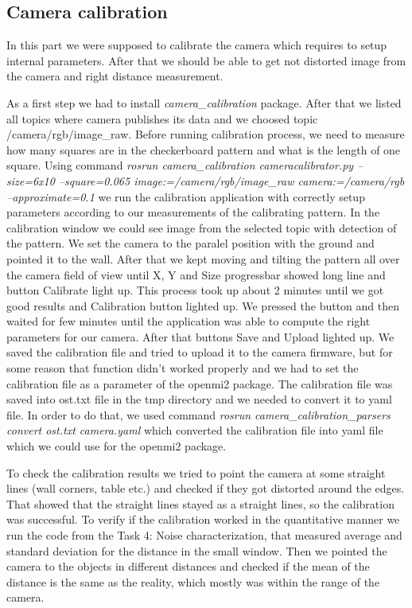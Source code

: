 \documentclass[11pt]{article}
\begin{document}
\subsection{Camera calibration}
   
	In this part we were supposed to calibrate the camera which requires to setup internal parameters. After that we should be able to get not distorted image from the camera and right distance measurement. \par
	As a first step we had to install \emph{camera_calibration} package. After that we listed all topics where camera publishes its data and we choosed topic /camera/rgb/image_raw. Before running calibration process, we need to measure how many squares are in the checkerboard pattern and what is the length of one square. Using command \emph{rosrun camera_calibration cameracalibrator.py --size=6x10 --square=0.065 image:=/camera/rgb/image_raw camera:=/camera/rgb --approximate=0.1} we run the calibration application with correctly setup parameters according to our measurements of the calibrating pattern. In the calibration window we could see image from the selected topic with detection of the pattern. We set the camera to the paralel position with the ground and pointed it to the wall. After that we kept moving and tilting the pattern all over the camera field of view until X, Y and Size progressbar showed long line and button Calibrate light up. This process took up about 2 minutes until we got good results and Calibration button lighted up. We pressed the button and then waited for few minutes until the application was able to compute the right parameters for our camera. After that buttons Save and Upload lighted up. We saved the calibration file and tried to upload it to the camera firmware, but for some reason that function didn't worked properly and we had to set the calibration file as a parameter of the openmi2 package. The calibration file was saved into ost.txt file in the tmp directory and we needed to convert it to yaml file. In order to do that, we used command \emph{rosrun camera_calibration_parsers convert  ost.txt camera.yaml} which converted the calibration file into yaml file which we could use for the openmi2 package. \par
	To check the calibration results we tried to point the camera at some straight lines (wall corners, table etc.) and checked if they got distorted around the edges. That showed that the straight lines stayed as a straight lines, so the calibration was successful. To verify if the calibration worked in the quantitative manner we run the code from the Task 4: Noise characterization, that measured average and standard deviation for the distance in the small window. Then we pointed the camera to the objects in different distances and checked if the mean of the distance is the same as the reality, which mostly was within the range of the camera. \par
	
\end{document}
